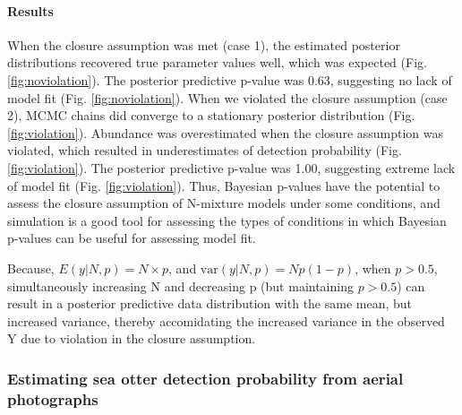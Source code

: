 \documentclass[12pt,english]{article}
\begin{document}
\begin{spacing}{1.9}
    \paragraph{Results}
    When the closure assumption was met (case 1), the estimated
    posterior distributions recovered true parameter values well,
    which was expected (Fig. \ref{fig:noviolation}). The posterior
    predictive p-value was 0.63, suggesting no lack of model fit
    (Fig. \ref{fig:noviolation}). When we violated the closure
    assumption (case 2), MCMC chains did converge to a stationary
    posterior distribution (Fig. \ref{fig:violation}). Abundance was
    overestimated when the closure assumption was violated, which
    resulted in underestimates of detection probability
    (Fig. \ref{fig:violation}). The posterior predictive p-value was
    1.00, suggesting extreme lack of model fit
    (Fig. \ref{fig:violation}). Thus, Bayesian p-values have the
    potential to assess the closure assumption of N-mixture models
    under some conditions, and simulation is a good tool for assessing
    the types of conditions in which Bayesian p-values can be useful
    for assessing model fit.

    Because, $E(y|N,p)=N\times p$, and $\text{var}(y|N,p)=Np(1-p)$,
    when $p>0.5$, simultaneously increasing N and decreasing p (but
    maintaining $p>0.5$) can result in a posterior predictive data
    distribution with the same mean, but increased variance, thereby
    accomidating the increased variance in the observed Y due to
    violation in the closure assumption.


    \subsubsection*{Estimating sea otter detection probability from aerial photographs}


\end{spacing}
\end{document}
